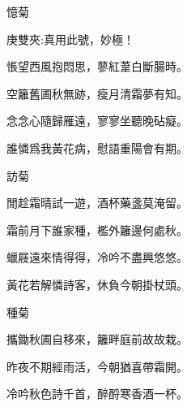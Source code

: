 \begin{poem}
    \begin{pl}憶菊　\end{pl}
    \begin{note}庚雙夾:真用此號，妙極！\end{note}

    \begin{pl}悵望西風抱悶思，蓼紅葦白斷腸時。\end{pl}

    \begin{pl}空籬舊圃秋無跡，瘦月清霜夢有知。\end{pl}

    \begin{pl}念念心隨歸雁遠，寥寥坐聽晚砧癡。\end{pl}

    \begin{pl}誰憐爲我黃花病，慰語重陽會有期。\end{pl}
    \emptypl

    \begin{pl}訪菊　\end{pl}

    \begin{pl}閒趁霜晴試一遊，酒杯藥盞莫淹留。\end{pl}

    \begin{pl}霜前月下誰家種，檻外籬邊何處秋。\end{pl}

    \begin{pl}蠟屐遠來情得得，冷吟不盡興悠悠。\end{pl}

    \begin{pl}黃花若解憐詩客，休負今朝掛杖頭。\end{pl}
    \emptypl

    \begin{pl}種菊　\end{pl}

    \begin{pl}攜鋤秋圃自移來，籬畔庭前故故栽。\end{pl}

    \begin{pl}昨夜不期經雨活，今朝猶喜帶霜開。\end{pl}

    \begin{pl}冷吟秋色詩千首，醉酹寒香酒一杯。\end{pl}


\end{poem}

